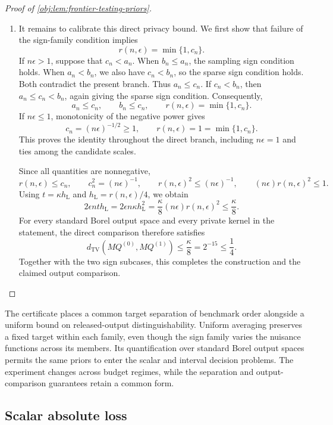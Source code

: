 \documentclass[11pt]{article}
\begin{document}
\begin{proof}[Proof of \cref{obj:lem:frontier-testing-priors}]
\begin{enumerate}
\item It remains to calibrate this direct privacy bound. We first show
that failure of the sign-family condition implies
\[
r(n,\epsilon)=\min\{1,c_n\}.
\]
If \(n\epsilon>1\), suppose that \(c_n<a_n\). When \(b_n\le a_n\), the
sampling sign condition holds. When \(a_n<b_n\), we also have
\(c_n<b_n\), so the sparse sign condition holds. Both contradict the
present branch. Thus \(a_n\le c_n\). If \(c_n<b_n\), then
\(a_n\le c_n<b_n\), again giving the sparse sign condition. Consequently,
\[
a_n\le c_n,\qquad b_n\le c_n,\qquad
r(n,\epsilon)=\min\{1,c_n\}.
\]
If \(n\epsilon\le1\), monotonicity of the negative power gives
\[
c_n=(n\epsilon)^{-1/2}\ge1,\qquad
r(n,\epsilon)=1=\min\{1,c_n\}.
\]
This proves the identity throughout the direct branch, including
\(n\epsilon=1\) and ties among the candidate scales.

Since all quantities are nonnegative,
\[
r(n,\epsilon)\le c_n,\qquad
c_n^2=(n\epsilon)^{-1},\qquad
r(n,\epsilon)^2\le(n\epsilon)^{-1},
\qquad
(n\epsilon)r(n,\epsilon)^2\le1.
\]
Using \(t=\kappa h_{\mathrm L}\) and
\(h_{\mathrm L}=r(n,\epsilon)/4\), we obtain
\[
2\epsilon nth_{\mathrm L}
=2\epsilon n\kappa h_{\mathrm L}^2
=\frac{\kappa}{8}(n\epsilon)r(n,\epsilon)^2
\le\frac{\kappa}{8}.
\]
For every standard Borel output space and every private kernel in the
statement, the direct comparison therefore satisfies
\[
d_{\mathrm{TV}}(MQ^{(0)},MQ^{(1)})
\le\frac{\kappa}{8}
=2^{-15}\le\frac14.
\]
Together with the two sign subcases, this completes the construction and
the claimed output comparison.
\end{enumerate}
\end{proof}

The certificate places a common target separation of benchmark order alongside a uniform bound on released-output distinguishability. Uniform averaging preserves a fixed target within each family, even though the sign family varies the nuisance functions across its members. Its quantification over standard Borel output spaces permits the same priors to enter the scalar and interval decision problems. The experiment changes across budget regimes, while the separation and output-comparison guarantees retain a common form.

\subsection{Scalar absolute loss}
\end{document}
